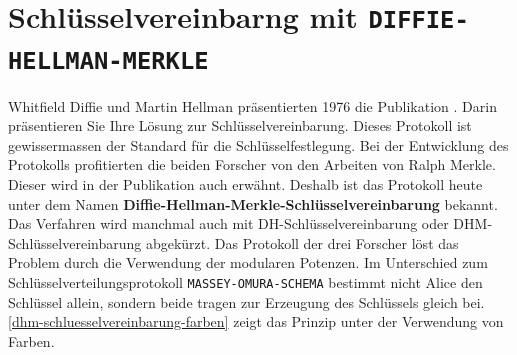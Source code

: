 
\toggletrue{image}
\toggletrue{imagehover}

\chapter{Schlüsselvereinbarng mit \texttt{DIFFIE-HELLMAN-MERKLE}}
\label{chapter-schluesselvereinbarung-diffie-hellman-merkle}

Whitfield Diffie und Martin Hellman präsentierten 1976 die Publikation . Darin präsentieren Sie Ihre Lösung zur Schlüsselvereinbarung. Dieses Protokoll ist gewissermassen der Standard für die Schlüsselfestlegung. Bei der Entwicklung des Protokolls profitierten die beiden Forscher von den Arbeiten von Ralph Merkle. Dieser wird in der Publikation auch erwähnt. Deshalb ist das Protokoll heute unter dem Namen \textbf{Diffie-Hellman-Merkle-Schlüsselvereinbarung} bekannt. Das Verfahren wird manchmal auch mit DH-Schlüsselvereinbarung oder DHM-Schlüsselvereinbarung abgekürzt. Das Protokoll der drei Forscher löst das Problem durch die Verwendung der modularen Potenzen. Im Unterschied zum Schlüsselverteilungsprotokoll \texttt{MASSEY-OMURA-SCHEMA} bestimmt nicht Alice den Schlüssel allein, sondern beide tragen zur Erzeugung des Schlüssels gleich bei. \autoref{dhm-schluesselvereinbarung-farben} zeigt das Prinzip unter der Verwendung von Farben.


